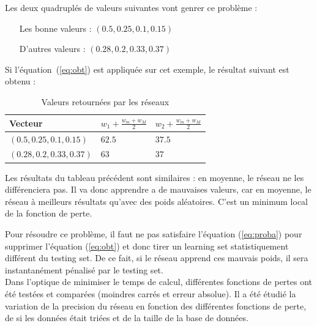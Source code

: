 \exemle
{
Les deux quadruplés de valeurs suivantes vont genrer ce problème :
\begin{itemize}
    \item[Les bonne valeurs :] $(0.5, 0.25, 0.1, 0.15)$
    \item[D'autres valeurs :] $(0.28, 0.2, 0.33, 0.37)$
\end{itemize}
Si l'équation\ (\ref{eq:obt}) est appliquée sur cet exemple, le résultat suivant est obtenu :
\begin{table}[H]
    \centering
    \begin{tabular}{|l|l|l|}
        \hline
        Vecteur & $w_1 + \frac{w_m + w_M}{2}$ & $w_2 + \frac{w_m + w_M}{2}$ \\ \hline \hline
        $(0.5, 0.25, 0.1, 0.15)$  & $62.5$ & $37.5$ \\ \hline
        $(0.28, 0.2, 0.33, 0.37)$ &  $63$  &  $37$  \\ \hline
    \end{tabular}
    \label{tab:pb_tab}
    \caption{Valeurs retournées par les réseaux}
\end{table}
Les résultats du tableau précédent sont similaires :
en moyenne, le réseau ne les différenciera pas.
Il va donc apprendre a de mauvaises valeurs,
car en moyenne, le réseau à meilleurs résultats qu'avec des poids aléatoires.
C'est un minimum local de la fonction de perte.
}


Pour résoudre ce problème, il faut ne pas satisfaire l'équation (\ref{eq:proba})
pour supprimer l'équation (\ref{eq:obt}) et donc tirer un learning
set statistiquement différent du testing set.
De ce fait, si le réseau apprend ces mauvais poids, il sera instantanément pénalisé par le testing set.\\


Dans l'optique de minimiser le temps de calcul,
différentes fonctions de pertes ont été testées et comparées
(moindres carrés et erreur absolue).
Il a été étudié la variation de la precision du réseau en fonction des différentes fonctions de perte,
de si les données était triées et de la taille de la base de données.
